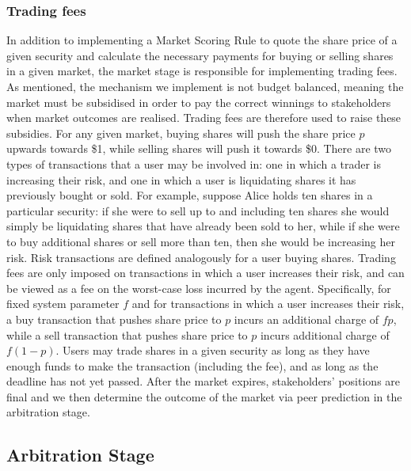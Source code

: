 \subsubsection{Trading fees}

In addition to implementing a Market Scoring Rule to quote the share price of a
given security and calculate the necessary payments for buying or selling
shares in a given market, the market stage is responsible for implementing
trading fees. As mentioned, the mechanism we implement is not budget balanced,
meaning the market must be subsidised in order to pay the correct winnings to
stakeholders when market outcomes are realised. Trading fees are therefore used
to raise these subsidies. For any given market, buying shares will push the
share price $p$ upwards towards \$1, while selling shares will push it towards
\$0. There are two types of transactions that a user may be involved in: one in
which a trader is increasing their risk, and one in which a user is liquidating
shares it has previously bought or sold. For example, suppose Alice holds ten
shares in a particular security: if she were to sell up to and including ten
shares she would simply be liquidating shares that have already been sold to
her, while if she were to buy additional shares or sell more than ten, then she
would be increasing her risk. Risk transactions are defined analogously for a
user buying shares. Trading fees are only imposed on transactions in which a
user increases their risk, and can be viewed as a fee on the worst-case loss
incurred by the agent. Specifically, for fixed system parameter $f$ and for
transactions in which a user increases their risk, a buy transaction that
pushes share price to $p$ incurs an additional charge of $fp$, while a sell
transaction that pushes share price to $p$ incurs additional charge of
$f(1-p)$. Users may trade shares in a given security as long as they have
enough funds to make the transaction (including the fee), and as long as the
deadline has not yet passed. After the market expires, stakeholders' positions
are final and we then determine the outcome of the market via peer prediction
in the arbitration stage.

\subsection{Arbitration Stage}


